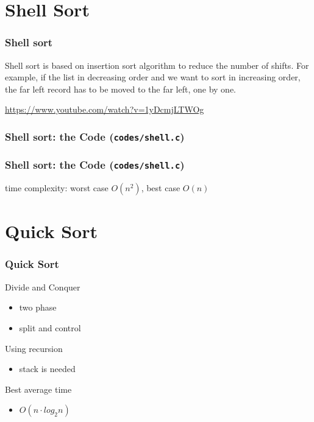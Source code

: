 \documentclass[newPxFont,sthlmFooter,nooffset]{beamer}
\begin{document}
\section{Shell Sort}
\begin{frame}[t]
  \frametitle{Shell sort}
Shell sort is based on insertion sort algorithm to reduce the number of shifts. For example, if the list in decreasing order and we want to sort in increasing order, the far left record has to be moved to the far left, one by one.

\url{https://www.youtube.com/watch?v=1yDcmjLTWOg}
\end{frame}

\begin{frame}[t, fragile]
  \frametitle{Shell sort: the Code (\texttt{codes/shell.c})}
  


\end{frame}

\begin{frame}[t, fragile]
  \frametitle{Shell sort: the Code (\texttt{codes/shell.c})}
  
time complexity: worst case $O(n^2)$, best case $O(n)$

\end{frame}


\section{Quick Sort}



\begin{frame}[t, fragile]
  \frametitle{Quick Sort}
Divide and Conquer
\begin{itemize}
\item two phase
\item split and control
\end{itemize}

Using recursion
\begin{itemize}
\item stack is needed
\end{itemize}

Best average time
\begin{itemize}
\item $O(n\cdot log_2n)$
\end{itemize}
\end{frame}
\end{document}
